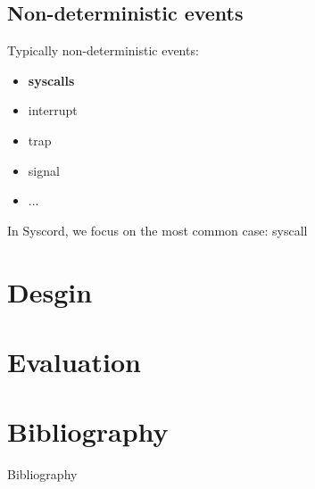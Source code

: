 \documentclass{ctexbeamer}
\begin{document}
\subsection{Non-deterministic events}
\begin{frame}
  Typically non-deterministic events: 
  \begin{itemize}
    \item \textbf{syscalls}
    \item interrupt
    \item trap
    \item signal
    \item ...
  \end{itemize}
  In Syscord, we focus on the most common case: syscall
\end{frame}

\section{Desgin}


\section{Evaluation}

\section{Bibliography}
  \begin{frame}[t,allowframebreaks]{Bibliography}
    \nocite{Nicholas1998Handbook}
    \printbibliography[]
  \end{frame}
    
\end{document}
